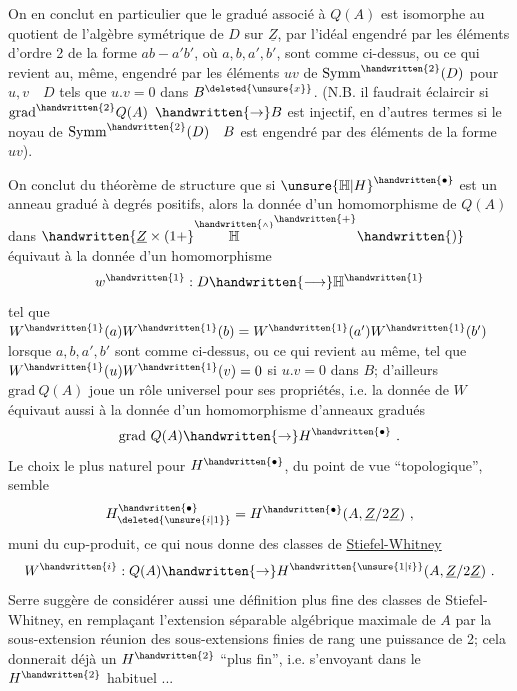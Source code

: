 On en conclut en particulier que le gradué associé à $Q(A)$ est isomorphe au quotient de l'algèbre symétrique de $D$ sur $\underline{Z}$, par  l'idéal engendré par les éléments d'ordre 2 de la forme $ab-a'b'$, où $a,b,a',b'$, sont comme ci-dessus, ou ce qui revient au, même, engendré par les éléments $uv$ de $\mathrm{Symm}^{\handwritten{2}}(D)$ pour $u,v\quad D$ tels que $u.v=0$ dans $B^{\deleted{\unsure{x}}}$. (N.B. il faudrait éclaircir si $\mathrm{grad}^{\handwritten{2}}Q(A)$  $\handwritten{\to}B$ est  injectif, en d'autres termes si le noyau de $\mathrm{Symm}^{\handwritten{2}}(D)\quad B$ est engendré par des éléments de la forme  $uv$).

On conclut du  théorème de structure que si ${\unsure{\mathbb{H}|H}}^{\handwritten{\bullet}}$ est un anneau gradué à degrés positifs, alors la donnée d'un homomorphisme  de $Q(A)$ dans $\handwritten{\underline{Z}\times(1+}\overset{\handwritten{\scriptscriptstyle\wedge}}{\mathbb{H}}^{\handwritten{+}}\handwritten{)}$ équivaut à la donnée d'un homomorphisme
\[
w^{\handwritten{1}}:D\handwritten{\longrightarrow}\mathbb{H}^{\handwritten{1}}
\]
tel que $W^{\handwritten{1}}(a)W^{\handwritten{1}}(b)=W^{\handwritten{1}}(a')W^{\handwritten{1}}(b')$ lorsque $a,b,a',b'$ sont comme ci-dessus, ou ce qui revient au même, tel que $W^{\handwritten{1}}(u)W^{\handwritten{1}}(v)=0$ si $u.v=0$ dans $B$;  d'ailleurs $\mathrm{grad}\ Q(A)$ joue un rôle universel pour ses propriétés, i.e. la donnée de $W$ équivaut aussi à la donnée d'un homomorphisme  d'anneaux gradués
\[
\mathrm{grad}\ Q(A)\handwritten{\to}H^{\handwritten{\bullet}}\ .
\]
Le choix le plus naturel pour $H^{\handwritten{\bullet}}$, du point de vue ``topologique'', semble
\[
H_{\deleted{\unsure{i|1}}}^{\handwritten{\bullet}}=H^{\handwritten{\bullet}}(A,\underline{Z}/2\underline{Z})\ ,
\]
muni du cup-produit, ce qui nous donne des classes de \uline{Stiefel-Whitney}
\[
W^{\handwritten{i}}:Q(A)\handwritten{\to}H^{\handwritten{\unsure{1|i}}}(A,\underline{Z}/2\underline{Z})\ .
\]
Serre suggère de  considérer aussi une définition plus fine des classes de Stiefel-Whitney, en remplaçant  l'extension séparable algébrique maximale de $A$ par la sous-extension réunion des sous-extensions finies de rang une puissance de 2; cela donnerait déjà un $H^{\handwritten{2}}$ ``plus fin'', i.e. s'envoyant dans le $H^{\handwritten{2}}$ habituel ...

